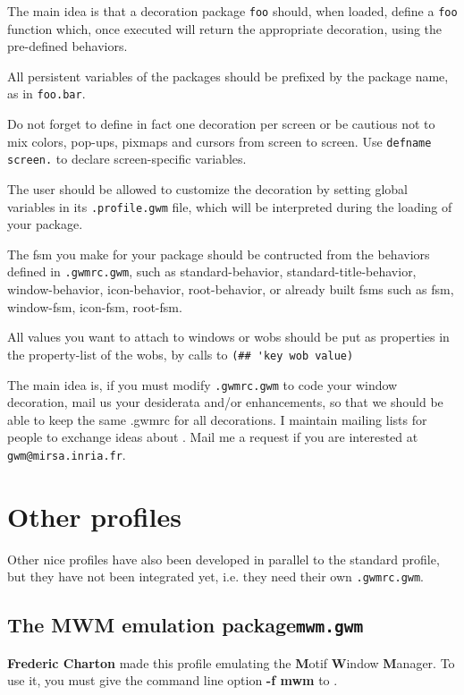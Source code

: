 The main idea is that a decoration package \verb"foo" should, when loaded,
define a \verb"foo" function which, once executed will return the appropriate
decoration, using the pre-defined behaviors.

All persistent variables of the packages should be prefixed by the package
name, as in \verb"foo.bar".

Do not forget to define in fact one decoration per screen or be cautious not
to mix colors, pop-ups, pixmaps and cursors from screen to screen. Use 
\verb"defname screen." to declare screen-specific variables.

The user should be allowed to customize the decoration by setting global
variables in its \verb".profile.gwm" file, which will be interpreted during
the loading of your package.

The fsm you make for your package should be contructed from the behaviors
defined in \verb".gwmrc.gwm", such as standard-behavior,
standard-title-behavior, window-behavior, icon-behavior, root-behavior, or
already built fsms such as fsm, window-fsm, icon-fsm, root-fsm.

All values you want to attach to windows or wobs should be put as properties
in the property-list of the wobs, by calls to 
\verb"(## 'key wob value)"

The main idea is, if you must modify {\tt .gwmrc.gwm} to code your window
decoration, mail us your desiderata and/or enhancements, so that we should
be able to keep the same .gwmrc for all decorations.
I maintain mailing lists for people to exchange ideas about {\GWM}. Mail me
a request if you are interested at \verb"gwm@mirsa.inria.fr".

\section{Other profiles}

Other nice profiles have also been developed in parallel to the standard
profile, but they have not been integrated yet, i.e. they need their own
{\tt .gwmrc.gwm}.

\subsection{The MWM emulation package\hfill{\tt mwm.gwm}}

{\bf Frederic Charton} made this profile emulating the {\bf M}otif
{\bf W}indow {\bf M}anager. To use it, you must give the command line 
option {\bf -f mwm} to {\GWM}.

